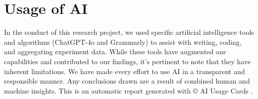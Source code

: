 


\section{Usage of AI}

In the conduct of this research project, we used specific artificial intelligence tools and algorithms (ChatGPT-4o and Grammarly) to assist with writing, coding, and aggregating experiment data. While these tools have augmented our capabilities and contributed to our findings, it's pertinent to note that they have inherent limitations. We have made every effort to use AI in a transparent and responsible manner. Any conclusions drawn are a result of combined human and machine insights. This is an automatic report generated with © AI Usage Cards \citep{wahle2023aiusagecard}.